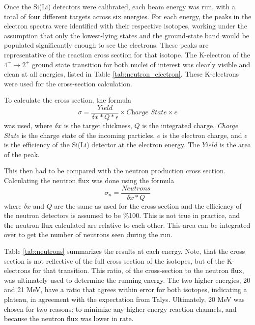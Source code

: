 

Once the Si(Li) detectors were calibrated, each beam energy was run, with a total of four different targets across six energies. For each energy, the peaks in the electron spectra were identified with their respective isotopes, working under the assumption that only the lowest-lying states and the ground-state band would be populated significantly enough to see the electrons. These peaks are representative of the reaction cross section for that isotope. The K-electron of the $4^+\rightarrow2^+$ ground state transition for both nuclei of interest was clearly visible and clean at all energies, listed in Table \ref{tab:neutron_electron}. These K-electrons were used for the cross-section calculation.



To calculate the cross section, the formula
\begin{equation}
    \sigma=\frac{Yield}{\delta x*Q*\epsilon}\times \textit{Charge State} \times e
    \label{eq:xs}
\end{equation}
was used, where $\delta x$ is the target thickness, $Q$ is the integrated charge, \textit{Charge State} is the charge state of the incoming particles, $e$ is the electron charge, and $\epsilon$ is the efficiency of the Si(Li) detector at the electron energy. The $Yield$ is the area of the peak.

This then had to be compared with the neutron production cross section. Calculating the neutron flux was done using the formula
\begin{equation}
    \sigma_n = \frac{Neutrons}{\delta x*Q}
\end{equation}
where $\delta x$ and $Q$ are the same as used for the cross section and the efficiency of the neutron detectors is assumed to be \%100. This is not true in practice, and the neutron flux calculated are relative to each other. This area can be integrated over to get the number of neutrons seen during the run.

Table \ref{tab:neutrons} summarizes the results at each energy. Note, that the cross section is not reflective of the full cross section of the isotopes, but of the K-electrons for that transition. This ratio, of the cross-section to the neutron flux, was ultimately used to determine the running energy. The two higher energies, 20 and 21 MeV, have a ratio that agrees within error for both isotopes, indicating a plateau, in agreement with the expectation from Talys. Ultimately, 20 MeV was chosen for two reasons: to minimize any higher energy reaction channels, and because the neutron flux was lower in rate.

